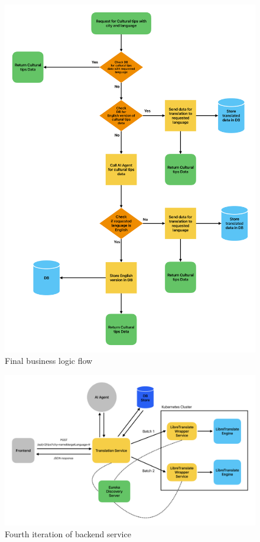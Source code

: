 \begin{figure}[H]
    \centering
    \includegraphics[width=1\linewidth]{chapter/05_implementation/backend/B_architectural_design/Business_Logic_Flow.pdf}
    \caption{Final business logic flow}
    \label{fig:backend_business_logic _flow}
\end{figure}



\begin{figure}[H]
    \centering
    \includegraphics[width=1\linewidth]{chapter/05_implementation/backend/B_architectural_design/Backend_Iteration_4.pdf}
    \caption{Fourth iteration of backend service}
    \label{fig:backend_iteration_4}
\end{figure}